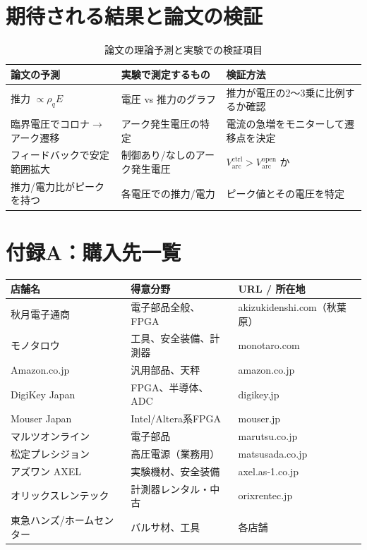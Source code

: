 \documentclass[12pt,a4paper]{ltjsarticle}
\begin{document}
\section{期待される結果と論文の検証}

\begin{table}[h]
\centering
\sffamily\small
\caption{論文の理論予測と実験での検証項目}
\begin{tabular}{@{}p{3.5cm}p{4cm}p{4cm}@{}}
\toprule
\textbf{論文の予測} & \textbf{実験で測定するもの} & \textbf{検証方法} \\
\midrule
推力 $\propto \rho_q E$
& 電圧 vs 推力のグラフ
& 推力が電圧の2〜3乗に比例するか確認 \\[6pt]
臨界電圧でコロナ$\to$アーク遷移
& アーク発生電圧の特定
& 電流の急増をモニターして遷移点を決定 \\[6pt]
フィードバックで安定範囲拡大
& 制御あり/なしのアーク発生電圧
& $V_{\mathrm{arc}}^{\mathrm{ctrl}} > V_{\mathrm{arc}}^{\mathrm{open}}$ か \\[6pt]
推力/電力比がピークを持つ
& 各電圧での推力/電力
& ピーク値とその電圧を特定 \\
\bottomrule
\end{tabular}
\end{table}

\newpage
\section*{付録A：購入先一覧}

\begin{table}[h]
\centering
\sffamily\small
\begin{tabular}{@{}p{3.5cm}p{4cm}p{4.5cm}@{}}
\toprule
\textbf{店舗名} & \textbf{得意分野} & \textbf{URL / 所在地} \\
\midrule
秋月電子通商 & 電子部品全般、FPGA & akizukidenshi.com（秋葉原） \\
モノタロウ & 工具、安全装備、計測器 & monotaro.com \\
Amazon.co.jp & 汎用部品、天秤 & amazon.co.jp \\
DigiKey Japan & FPGA、半導体、ADC & digikey.jp \\
Mouser Japan & Intel/Altera系FPGA & mouser.jp \\
マルツオンライン & 電子部品 & marutsu.co.jp \\
松定プレシジョン & 高圧電源（業務用） & matsusada.co.jp \\
アズワン AXEL & 実験機材、安全装備 & axel.as-1.co.jp \\
オリックスレンテック & 計測器レンタル・中古 & orixrentec.jp \\
東急ハンズ/ホームセンター & バルサ材、工具 & 各店舗 \\
\bottomrule
\end{tabular}
\end{table}
\end{document}

